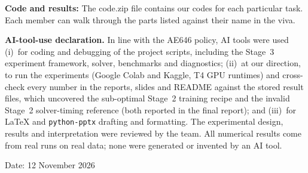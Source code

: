 \documentclass[10.5pt,a4paper]{article}
\begin{document}
\vspace{6pt}
\noindent\textbf{Code and results:} The code.zip file contains our codes for each particular task. Each member can walk through the parts listed against their name in the viva.

\vspace{6pt}
\noindent\textbf{AI-tool-use declaration.} In line with the AE646 policy, AI tools were used (i)~for coding and debugging of the project scripts, including the Stage~3 experiment framework, solver, benchmarks and diagnostics; (ii)~at our direction, to run the experiments (Google Colab and Kaggle, T4 GPU runtimes) and cross-check every number in the reports, slides and README against the stored result files, which uncovered the sub-optimal Stage~2 training recipe and the invalid Stage~2 solver-timing reference (both reported in the final report); and (iii)~for LaTeX and \texttt{python-pptx} drafting and formatting. The experimental design, results and interpretation were reviewed by the team. All numerical results come from real runs on real data; none were generated or invented by an AI tool.

\vspace{18pt}
\noindent Date: 12 November 2026
\end{document}
